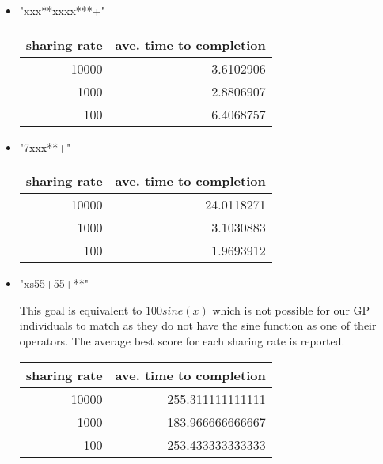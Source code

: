 \documentclass[11pt]{article}
\begin{document}
\begin{itemize}
\begin{itemize}
\item "xxx**xxxx***+"\\
\label{sec-1.5.3.2.1}


\begin{center}
\begin{tabular}{rr}
 sharing rate  &  ave. time to completion  \\
\hline
        10000  &                3.6102906  \\
         1000  &                2.8806907  \\
          100  &                6.4068757  \\
\end{tabular}
\end{center}




\item "7xxx**+"\\
\label{sec-1.5.3.2.2}


\begin{center}
\begin{tabular}{rr}
 sharing rate  &  ave. time to completion  \\
\hline
        10000  &               24.0118271  \\
         1000  &                3.1030883  \\
          100  &                1.9693912  \\
\end{tabular}
\end{center}




\item "xs55+55+**"\\
\label{sec-1.5.3.2.3}

This goal is equivalent to $100 sine(x)$ which is not possible for our
GP individuals to match as they do not have the sine function as one
of their operators.  The average best score for each sharing rate is
reported.

\begin{center}
\begin{tabular}{rr}
 sharing rate  &  ave. time to completion  \\
\hline
        10000  &         255.311111111111  \\
         1000  &         183.966666666667  \\
          100  &         253.433333333333  \\
\end{tabular}
\end{center}




\end{itemize}
\end{itemize}
\end{document}
